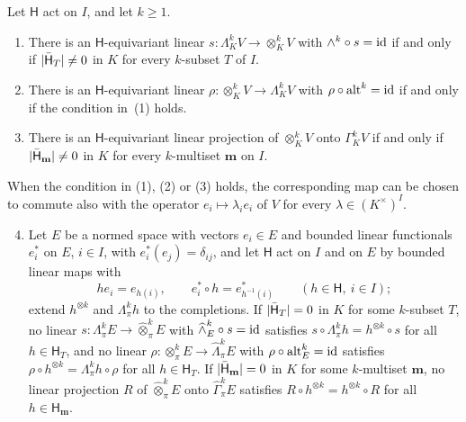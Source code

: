 \begin{theorem}\label{can:thm:permutation}
Let $\mathsf H$ act on $I$, and let $k\ge1$.
\begin{enumerate}
\item There is an $\mathsf H$\nobreakdash-equivariant linear $s\colon\Lambda^k_KV\to\otimes^k_KV$ with
$\wedge^k\circ s=\mathrm{id}$ if and only if $\lvert \bar{\mathsf H}_T\rvert\ne0$ in $K$ for every $k$\nobreakdash-subset $T$ of $I$.
\item There is an $\mathsf H$\nobreakdash-equivariant linear $\rho\colon\otimes^k_KV\to\Lambda^k_KV$ with
$\rho\circ\operatorname{alt}^k=\mathrm{id}$ if and only if the condition in~(1) holds.
\item There is an $\mathsf H$\nobreakdash-equivariant linear projection of $\otimes^k_KV$ onto $\Gamma^k_KV$ if and only
if $\lvert \bar{\mathsf H}_{\mathbf m}\rvert\ne0$ in $K$ for every $k$\nobreakdash-multiset $\mathbf m$ on $I$.
\end{enumerate}
When the condition in (1), (2) or (3) holds, the corresponding map can be chosen to commute also with the operator
$e_i\mapsto\lambda_ie_i$ of $V$ for every $\lambda\in(K^\times)^I$.
\begin{enumerate}\setcounter{enumi}{3}
\item Let $E$ be a normed space with vectors $e_i\in E$ and bounded linear functionals $e^*_i$ on $E$, $i\in I$, with
$e^*_i(e_j)=\delta_{ij}$, and let $\mathsf H$ act on $I$ and on $E$ by bounded linear maps with
\begin{equation}\label{can:eq:compatible}
 he_i=e_{h(i)},\qquad e^*_i\circ h=e^*_{h^{-1}(i)}\qquad(h\in\mathsf H,\ i\in I);
\end{equation}
extend $h^{\otimes k}$ and $\Lambda^k_\pi h$ to the completions. If $\lvert \bar{\mathsf H}_T\rvert=0$ in $K$ for some
$k$\nobreakdash-subset $T$, no linear $s\colon\Lambda^k_\pi E\to\widehat\otimes^k_\pi E$ with
$\widehat\wedge^k_E\circ s=\mathrm{id}$ satisfies $s\circ\Lambda^k_\pi h=h^{\otimes k}\circ s$ for all $h\in\mathsf H_T$, and no
linear $\rho\colon\otimes^k_\pi E\to\widehat\Lambda^k_\pi E$ with $\rho\circ\operatorname{alt}^k_E=\mathrm{id}$ satisfies
$\rho\circ h^{\otimes k}=\Lambda^k_\pi h\circ\rho$ for all $h\in\mathsf H_T$. If $\lvert \bar{\mathsf H}_{\mathbf m}\rvert=0$ in
$K$ for some $k$\nobreakdash-multiset $\mathbf m$, no linear projection $R$ of $\widehat\otimes^k_\pi E$ onto
$\widehat\Gamma^k_\pi E$ satisfies $R\circ h^{\otimes k}=h^{\otimes k}\circ R$ for all $h\in\mathsf H_{\mathbf m}$.
\end{enumerate}
\end{theorem}

